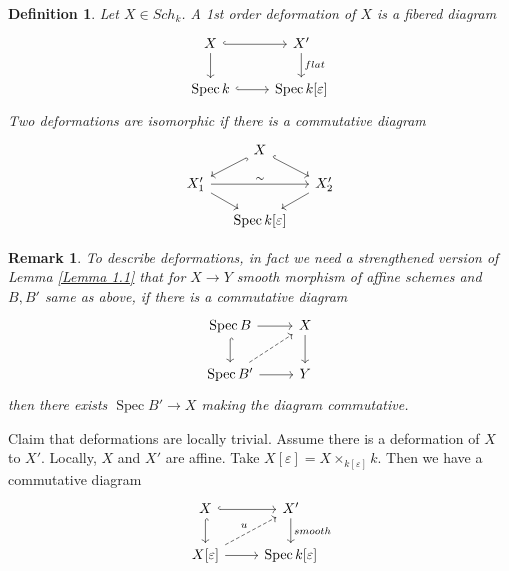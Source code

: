 \documentclass{ctexart}
\newtheorem{definition}{Definition}[section]
\newtheorem{remark}{Remark}[section]
\newcommand{\spec}{\operatorname{Spec}}
\begin{document}
\begin{definition}
    Let $X\in Sch_{k}$.
    A 1st order deformation of $X$ is a fibered diagram
    \begin{equation}
        \begin{tikzcd}
            X \arrow[r, hookrightarrow] \arrow[d] &
            X' \arrow[d, "flat"] \\
            \spec k \arrow[r, hookrightarrow] &
            \spec k[\varepsilon]
        \end{tikzcd}
    \end{equation}
    Two deformations are isomorphic if there is a commutative diagram
    \begin{equation}
        \begin{tikzcd}[sep = small]
            & X \arrow[dr, hookrightarrow] \arrow[dl, hookrightarrow] & \\
            X_{1}' \arrow[rr, "\sim"] \arrow[dr] &&
            X_{2}' \arrow[dl] \\
            & \spec k[\varepsilon] &
        \end{tikzcd}
    \end{equation}
\end{definition}
\begin{remark}
    To describe deformations, in fact we need a strengthened version of Lemma \ref{Lemma 1.1} that for $X \rightarrow Y$ smooth morphism of affine schemes and $B, B'$ same as above,
    if there is a commutative diagram
    \begin{equation}
        \begin{tikzcd}
            \spec B \arrow[r] \arrow[d, hookrightarrow] &
            X \arrow[d] \\
            \spec B' \arrow[ur, dashrightarrow] \arrow[r] &
            Y
        \end{tikzcd}
    \end{equation}
    then there exists $\spec B' \rightarrow X$ making the diagram commutative.
\end{remark}
Claim that deformations are locally trivial.
Assume there is a deformation of $X$ to $X'$.
Locally, $X$ and $X'$ are affine.
Take $X[\varepsilon] = X \times_{k[\varepsilon]} k$.
Then we have a commutative diagram
\begin{equation}
    \begin{tikzcd}
        X \arrow[r, hookrightarrow] \arrow[d, hookrightarrow] &
        X' \arrow[d, "smooth"] \\
        X[\varepsilon] \arrow[ur, dashrightarrow, "u"] \arrow[r] &
        \spec k[\varepsilon]
    \end{tikzcd}
\end{equation}
\end{document}
